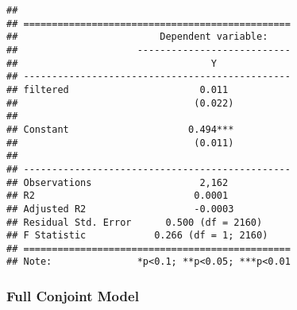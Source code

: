 \documentclass[
]{article}
\newenvironment{Shaded}{\begin{snugshade}}{\end{snugshade}}
\newcommand{\AttributeTok}[1]{\textcolor[rgb]{0.77,0.63,0.00}{#1}}
\newcommand{\CommentTok}[1]{\textcolor[rgb]{0.56,0.35,0.01}{\textit{#1}}}
\newcommand{\FunctionTok}[1]{\textcolor[rgb]{0.00,0.00,0.00}{#1}}
\newcommand{\NormalTok}[1]{#1}
\newcommand{\OtherTok}[1]{\textcolor[rgb]{0.56,0.35,0.01}{#1}}
\newcommand{\SpecialCharTok}[1]{\textcolor[rgb]{0.00,0.00,0.00}{#1}}
\newcommand{\StringTok}[1]{\textcolor[rgb]{0.31,0.60,0.02}{#1}}
\begin{document}
\begin{verbatim}
## 
## ===============================================
##                         Dependent variable:    
##                     ---------------------------
##                                  Y             
## -----------------------------------------------
## filtered                       0.011           
##                               (0.022)          
##                                                
## Constant                     0.494***          
##                               (0.011)          
##                                                
## -----------------------------------------------
## Observations                   2,162           
## R2                            0.0001           
## Adjusted R2                   -0.0003          
## Residual Std. Error      0.500 (df = 2160)     
## F Statistic            0.266 (df = 1; 2160)    
## ===============================================
## Note:               *p<0.1; **p<0.05; ***p<0.01
\end{verbatim}

\hypertarget{full-conjoint-model}{%
\subsubsection{Full Conjoint Model}\label{full-conjoint-model}}

\begin{Shaded}
\end{Shaded}
\end{document}
